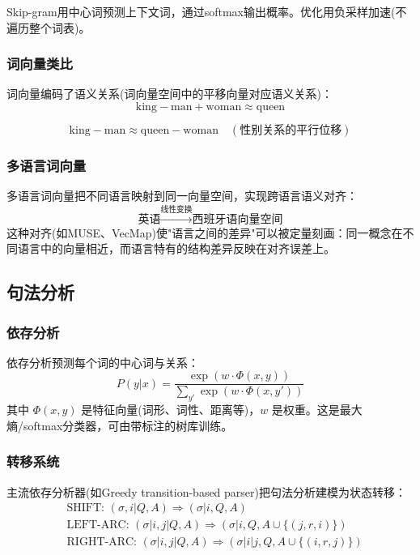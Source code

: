 Skip-gram用中心词预测上下文词，通过softmax输出概率。优化用负采样加速(不遍历整个词表)。

\subsubsection{词向量类比}

词向量编码了语义关系(词向量空间中的平移向量对应语义关系)：
\begin{equation}
    \text{king} - \text{man} + \text{woman} \approx \text{queen}
\end{equation}

\begin{equation}
    \text{king} - \text{man} \approx \text{queen} - \text{woman} \quad (\text{性别关系的平行位移})
\end{equation}

\subsubsection{多语言词向量}

多语言词向量把不同语言映射到同一向量空间，实现跨语言语义对齐：
\begin{equation}
    \text{英语} \xrightarrow{\text{线性变换}} \text{西班牙语向量空间}
\end{equation}
这种对齐(如MUSE、VecMap)使"语言之间的差异"可以被定量刻画：同一概念在不同语言中的向量相近，而语言特有的结构差异反映在对齐误差上。

\subsection{句法分析}

\subsubsection{依存分析}

依存分析预测每个词的中心词与关系：
\begin{equation}
    P(y|x) = \frac{\exp(w \cdot \Phi(x, y))}{\sum_{y'} \exp(w \cdot \Phi(x, y'))}
\end{equation}
其中 $\Phi(x,y)$ 是特征向量(词形、词性、距离等)，$w$ 是权重。这是最大熵/softmax分类器，可由带标注的树库训练。

\subsubsection{转移系统}

主流依存分析器(如Greedy transition-based parser)把句法分析建模为状态转移：
\begin{equation}
    \begin{aligned}
    &\text{SHIFT: } (\sigma, i|Q, A) \Rightarrow (\sigma|i, Q, A) \\
    &\text{LEFT-ARC: } (\sigma|i, j|Q, A) \Rightarrow (\sigma|i, Q, A \cup \{(j, r, i)\}) \\
    &\text{RIGHT-ARC: } (\sigma|i, j|Q, A) \Rightarrow (\sigma|i|j, Q, A \cup \{(i, r, j)\})
    \end{aligned}
\end{equation}


